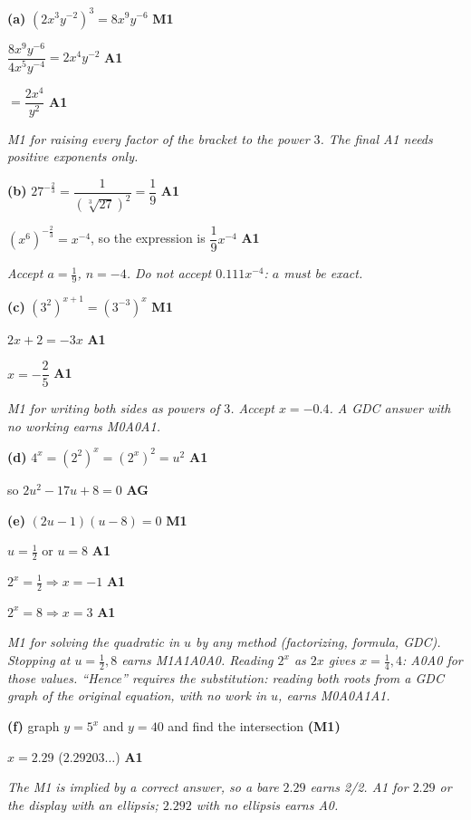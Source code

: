 \documentclass[12pt, twoside]{article}
\begin{document}
\begin{enumerate}[itemsep=0.3cm]
\textbf{(a)} $\left(2x^{3}y^{-2}\right)^{3} = 8x^{9}y^{-6}$ \hfill \textbf{M1}

$\dfrac{8x^{9}y^{-6}}{4x^{5}y^{-4}} = 2x^{4}y^{-2}$ \hfill \textbf{A1}

$= \dfrac{2x^{4}}{y^{2}}$ \hfill \textbf{A1}

\emph{M1 for raising every factor of the bracket to the power $3$. The final
A1 needs positive exponents only.}

\textbf{(b)} $27^{-\frac{2}{3}} = \dfrac{1}{\left(\sqrt[3]{27}\right)^{2}} = \dfrac{1}{9}$ \hfill \textbf{A1}

$\left(x^{6}\right)^{-\frac{2}{3}} = x^{-4}$, \quad so the expression is $\dfrac{1}{9}x^{-4}$ \hfill \textbf{A1}

\emph{Accept $a = \frac{1}{9}$, $n = -4$. Do not accept $0.111x^{-4}$:
$a$ must be exact.}

\textbf{(c)} $\left(3^{2}\right)^{x + 1} = \left(3^{-3}\right)^{x}$ \hfill \textbf{M1}

$2x + 2 = -3x$ \hfill \textbf{A1}

$x = -\dfrac{2}{5}$ \hfill \textbf{A1}

\emph{M1 for writing both sides as powers of $3$. Accept $x = -0.4$. A GDC
answer with no working earns M0A0A1.}

\textbf{(d)} $4^{x} = \left(2^{2}\right)^{x} = \left(2^{x}\right)^{2} = u^{2}$ \hfill \textbf{A1}

so $2u^{2} - 17u + 8 = 0$ \hfill \textbf{AG}

\textbf{(e)} $(2u - 1)(u - 8) = 0$ \hfill \textbf{M1}

$u = \frac{1}{2}$ or $u = 8$ \hfill \textbf{A1}

$2^{x} = \frac{1}{2} \Rightarrow x = -1$ \hfill \textbf{A1}

$2^{x} = 8 \Rightarrow x = 3$ \hfill \textbf{A1}

\emph{M1 for solving the quadratic in $u$ by any method (factorizing,
formula, GDC). Stopping at $u = \frac{1}{2}, 8$ earns M1A1A0A0. Reading
$2^{x}$ as $2x$ gives $x = \frac{1}{4}, 4$: A0A0 for those values. ``Hence'' requires
the substitution: reading both roots from a GDC graph of the original
equation, with no work in $u$, earns M0A0A1A1.}

\textbf{(f)} graph $y = 5^{x}$ and $y = 40$ and find the intersection \hfill \textbf{(M1)}

$x = 2.29$ \quad ($2.29203\ldots$) \hfill \textbf{A1}

\emph{The M1 is implied by a correct answer, so a bare $2.29$ earns 2/2. A1 for $2.29$ or the display
with an ellipsis; $2.292$ with no ellipsis earns A0.}


\end{enumerate}
\end{document}
